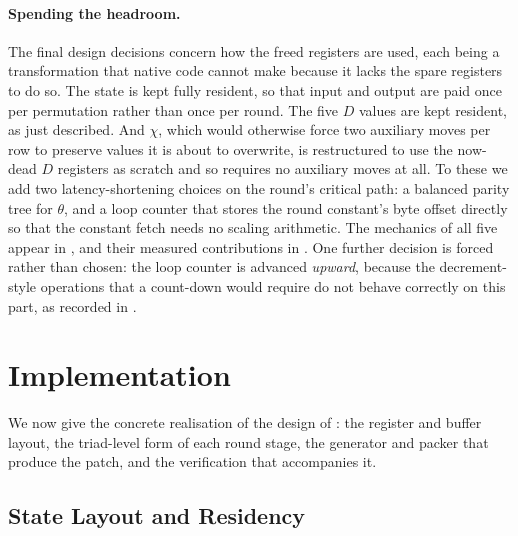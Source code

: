 \paragraph{Spending the headroom.}
The final design decisions concern how the freed registers are used, each being
a transformation that native code cannot make because it lacks the spare
registers to do so. The state is kept fully resident, so that input and output
are paid once per permutation rather than once per round. The five $D$ values
are kept resident, as just described. And $\chi$, which would otherwise force
two auxiliary moves per row to preserve values it is about to overwrite, is
restructured to use the now-dead $D$ registers as scratch and so requires no
auxiliary moves at all. To these we add two latency-shortening choices on the
round's critical path: a balanced parity tree for $\theta$, and a loop counter
that stores the round constant's byte offset directly so that the constant
fetch needs no scaling arithmetic. The mechanics of all five appear in
, and their measured contributions in
. One further decision is forced rather than chosen: the
loop counter is advanced \emph{upward}, because the decrement-style operations
that a count-down would require do not behave correctly on this part, as
recorded in .

\section{Implementation}
\label{sec:keccak-impl}

We now give the concrete realisation of the design of :
the register and buffer layout, the triad-level form of each round stage, the
generator and packer that produce the patch, and the verification that
accompanies it.

\subsection{State Layout and Residency}
\label{sec:keccak-layout}

